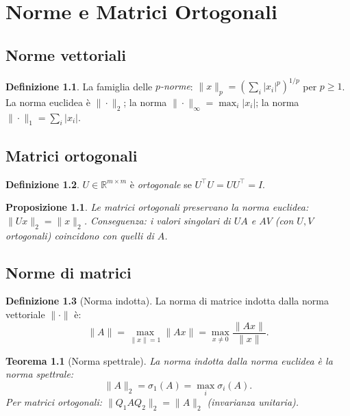 \documentclass[11pt, a4paper, twoside]{book}
\theoremstyle{definition}
\newtheorem{defn}{Definizione}[chapter]
\theoremstyle{plain}
\newtheorem{thm}{Teorema}[chapter]
\newtheorem{prop}{Proposizione}[chapter]
\theoremstyle{remark}
\newcommand{\R}{\mathbb{R}}
\begin{document}
\chapter{Norme e Matrici Ortogonali}

\section{Norme vettoriali}

\begin{defn}
La famiglia delle \emph{$p$-norme}: $\|x\|_p = \left(\sum_i |x_i|^p\right)^{1/p}$ per $p \geq 1$. La norma euclidea è $\|\cdot\|_2$; la norma $\|\cdot\|_\infty = \max_i |x_i|$; la norma $\|\cdot\|_1 = \sum_i |x_i|$.
\end{defn}

\section{Matrici ortogonali}

\begin{defn}
$U \in \R^{m \times m}$ è \emph{ortogonale} se $U^\top U = UU^\top = I$.
\end{defn}

\begin{prop}
Le matrici ortogonali preservano la norma euclidea: $\|Ux\|_2 = \|x\|_2$.
Conseguenza: i valori singolari di $UA$ e $AV$ (con $U, V$ ortogonali) coincidono con quelli di $A$.
\end{prop}

\section{Norme di matrici}
\label{sec:norme-matrici}

\begin{defn}[Norma indotta]
La norma di matrice indotta dalla norma vettoriale $\|\cdot\|$ è:
\[
  \|A\| = \max_{\|x\|=1} \|Ax\| = \max_{x \neq 0} \frac{\|Ax\|}{\|x\|}.
\]
\end{defn}

\begin{thm}[Norma spettrale]
La norma indotta dalla norma euclidea è la \emph{norma spettrale}:
\[
  \|A\|_2 = \sigma_1(A) = \max_i \sigma_i(A).
\]
Per matrici ortogonali: $\|Q_1 A Q_2\|_2 = \|A\|_2$ (invarianza unitaria).
\end{thm}
\end{document}
